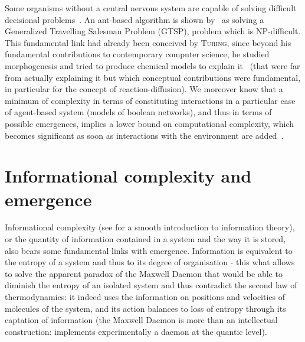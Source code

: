\documentclass[graybox]{svmult}
\newcommand{\noun}[1]{\textsc{#1}}
\begin{document}
Some organisms without a central nervous system are capable of solving difficult decisional problems~\cite{reid2016decision}. An ant-based algorithm is shown by~\cite{Pintea2017} as solving a Generalized Travelling Salesman Problem (GTSP), problem which is NP-difficult. This fundamental link had already been conceived by \noun{Turing}, since beyond his fundamental contributions to contemporary computer science, he studied morphogenesis and tried to produce chemical models to explain it~\cite{turing1952chemical} (that were far from actually explaining it but which conceptual contributions were fundamental, in particular for the concept of reaction-diffusion). We moreover know that a minimum of complexity in terms of constituting interactions in a particular case of agent-based system (models of boolean networks), and thus in terms of possible emergences, implies a lower bound on computational complexity, which becomes significant as soon as interactions with the environment are added~\cite{tovsic2017boolean}.








\section{Informational complexity and emergence}





Informational complexity (see \cite{dedeo2016information} for a smooth introduction to information theory), or the quantity of information contained in a system and the way it is stored, also bears some fundamental links with emergence. Information is equivalent to the entropy of a system and thus to its degree of organisation - this what allows to solve the apparent paradox of the Maxwell Daemon that would be able to diminish the entropy of an isolated system and thus contradict the second law of thermodynamics: it indeed uses the information on positions and velocities of molecules of the system, and its action balances to loss of entropy through its captation of information (the Maxwell Daemon is more than an intellectual construction: \cite{cottet2017observing} implements experimentally a daemon at the quantic level).
\end{document}
